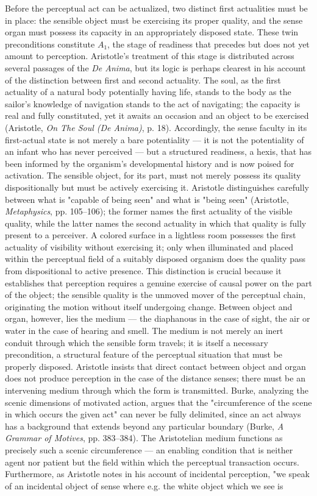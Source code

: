 Before the perceptual act can be actualized, two distinct first actualities must be in place: the sensible object must be exercising its proper quality, and the sense organ must possess its capacity in an appropriately disposed state. These twin preconditions constitute $A_1$, the stage of readiness that precedes but does not yet amount to perception. Aristotle's treatment of this stage is distributed across several passages of the \textit{De Anima}, but its logic is perhaps clearest in his account of the distinction between first and second actuality. The soul, as the first actuality of a natural body potentially having life, stands to the body as the sailor's knowledge of navigation stands to the act of navigating; the capacity is real and fully constituted, yet it awaits an occasion and an object to be exercised (Aristotle, \textit{On The Soul (De Anima)}, p. 18). Accordingly, the sense faculty in its first-actual state is not merely a bare potentiality --- it is not the potentiality of an infant who has never perceived --- but a structured readiness, a hexis, that has been informed by the organism's developmental history and is now poised for activation. The sensible object, for its part, must not merely possess its quality dispositionally but must be actively exercising it. Aristotle distinguishes carefully between what is "capable of being seen" and what is "being seen" (Aristotle, \textit{Metaphysics}, pp. 105--106); the former names the first actuality of the visible quality, while the latter names the second actuality in which that quality is fully present to a perceiver. A colored surface in a lightless room possesses the first actuality of visibility without exercising it; only when illuminated and placed within the perceptual field of a suitably disposed organism does the quality pass from dispositional to active presence. This distinction is crucial because it establishes that perception requires a genuine exercise of causal power on the part of the object; the sensible quality is the unmoved mover of the perceptual chain, originating the motion without itself undergoing change. Between object and organ, however, lies the medium --- the diaphanous in the case of sight, the air or water in the case of hearing and smell. The medium is not merely an inert conduit through which the sensible form travels; it is itself a necessary precondition, a structural feature of the perceptual situation that must be properly disposed. Aristotle insists that direct contact between object and organ does not produce perception in the case of the distance senses; there must be an intervening medium through which the form is transmitted. Burke, analyzing the scenic dimensions of motivated action, argues that the "circumference of the scene in which occurs the given act" can never be fully delimited, since an act always has a background that extends beyond any particular boundary (Burke, \textit{A Grammar of Motives}, pp. 383--384). The Aristotelian medium functions as precisely such a scenic circumference --- an enabling condition that is neither agent nor patient but the field within which the perceptual transaction occurs. Furthermore, as Aristotle notes in his account of incidental perception, "we speak of an incidental object of sense where e.g. the white object which we see is 